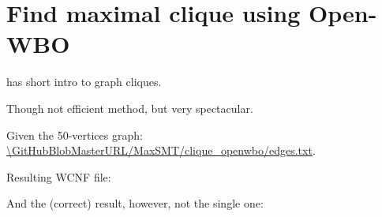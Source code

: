 \section{Find maximal clique using Open-WBO}

\MathForProg has short intro to graph cliques.

\renewcommand{\CURPATH}{MaxSMT/clique_openwbo}

Though not efficient method, but very spectacular.

Given the 50-vertices graph: \url{\GitHubBlobMasterURL/\CURPATH/edges.txt}.



Resulting WCNF file:



And the (correct) result, however, not the single one:



